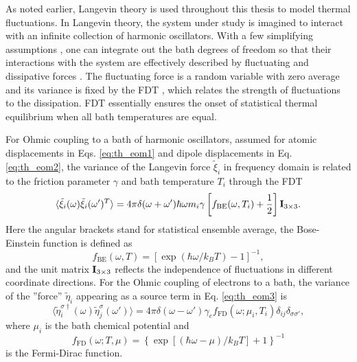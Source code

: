 As noted earlier, Langevin theory is used throughout this thesis to model thermal fluctuations. In Langevin theory, the system under study is imagined to interact with an infinite collection of harmonic oscillators. With a few simplifying assumptions \cite{weiss}, one can integrate out the bath degrees of freedom so that their interactions with the system are effectively described by fluctuating and dissipative forces \cite{weiss,dhar06}. The fluctuating force is a random variable with zero average and its variance is fixed by the FDT \cite{nyquist28,callen51}, which relates the strength of fluctuations to the dissipation. FDT essentially ensures the onset of statistical thermal equilibrium when all bath temperatures are equal.

For Ohmic coupling to a bath of harmonic oscillators, assumed for atomic displacements in Eqs. \eqref{eq:th_eom1} and dipole displacements in Eq. \eqref{eq:th_eom2}, the variance of the Langevin force $\tilde{\xi}_i$ in frequency domain is related to the friction parameter $\gamma$ and bath temperature $T_i$ through the FDT \cite{weiss,dhar06}
\begin{equation}
 \langle \tilde \xi_i(\omega) \tilde \xi_i(\omega')^T \rangle = 4\pi \delta(\omega+\omega') \hbar \omega m_i \gamma \left[f_{\textrm{BE}}(\omega,T_i)+ \frac{1}{2} \right] \mathbf{I}_{3\times 3}. \label{eq:th_xixiom_ohmic_qm}
\end{equation}
Here the angular brackets stand for statistical ensemble average, the Bose-Einstein function is defined as
\begin{equation}
 f_{\textrm{BE}}(\omega,T)=\left[\exp(\hbar \omega/k_BT)-1\right]^{-1}, \label{eq:th_fBE}
\end{equation}
and the unit matrix $\mathbf{I}_{3 \times 3}$ reflects the independence of fluctuations in different coordinate directions. For the Ohmic coupling of electrons to a bath, the variance of the ''force'' $\tilde{\eta}_i$ appearing as a source term in Eq. \eqref{eq:th_eom3} is \cite{dhar03,dhar06b,roy07}
\begin{equation}
 \langle \tilde \eta_{i}^{\sigma\dagger}(\omega) \tilde \eta_{j}^{\sigma}(\omega') \rangle = 4\pi\delta(\omega-\omega') \gamma_e f_{\textrm{FD}}(\omega;\mu_{i},T_{i}) \delta_{ij}\delta_{\sigma\sigma'}, \label{eq:th_etaetaom}
\end{equation}
where $\mu_i$ is the bath chemical potential and 
\begin{equation}
 f_{\textrm{FD}}(\omega;T,\mu)=\left\{\exp\left[(\hbar \omega-\mu)/k_BT\right]+1\right\}^{-1}
\end{equation}
is the Fermi-Dirac function.

